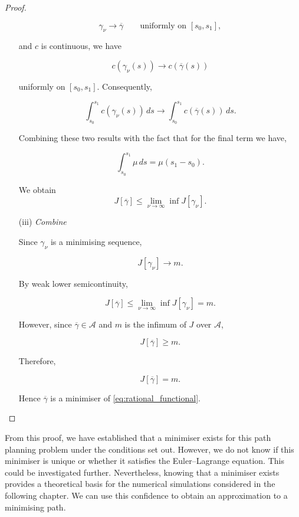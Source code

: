 \begin{proof}
\begin{enumerate}
        $$
        \gamma_\nu\rightarrow\overline{\gamma}
        \qquad\text{uniformly on }[s_0,s_1],
        $$
        
        and $c$ is continuous, we have
        
        $$
        c(\gamma_\nu(s))
        \rightarrow
        c(\overline{\gamma}(s))
        $$
        
        uniformly on $[s_0,s_1]$. Consequently,
        
        $$
        \int_{s_0}^{s_1}c(\gamma_\nu(s))\,ds
        \longrightarrow
        \int_{s_0}^{s_1}c(\overline{\gamma}(s))\,ds.
        $$
        
        Combining these two results with the fact that for the final term we have,

        $$
        \int_{s_0}^{s_1}\mu\,ds
        =
        \mu(s_1-s_0).
        $$
        
        We obtain
        $$
        J[\overline{\gamma}]
        \leq
        \lim_{\nu\rightarrow\infty}\inf J[\gamma_\nu].
        $$

        

        \item[(iii)] \textit{Combine}

        Since ${\gamma_\nu}$ is a minimising sequence,

        $$
        J[\gamma_\nu]\longrightarrow m.
        $$
        
        By weak lower semicontinuity,
        
        $$
        J[\overline{\gamma}]
        \leq
        \lim_{\nu\rightarrow\infty}\inf J[\gamma_\nu]
        =
        m.
        $$
        
        However, since $\overline{\gamma}\in\mathcal{A}$ and $m$ is the infimum of $J$ over $\mathcal{A}$,
        
        $$
        J[\overline{\gamma}]\geq m.
        $$
        
        Therefore,
        
        $$
        J[\overline{\gamma}]=m.
        $$
        
        Hence $\overline{\gamma}$ is a minimiser of \eqref{eq:rational_functional}.

\end{enumerate}
\end{proof}

From this proof, we have established that a minimiser exists for this path planning problem under the conditions set out. However, we do not know if this minimiser is unique or whether it satisfies the Euler--Lagrange equation. This could be investigated further. Nevertheless, knowing that a minimiser exists provides a theoretical basis for the numerical simulations considered in the following chapter. We can use this confidence to obtain an approximation to a minimising path.

